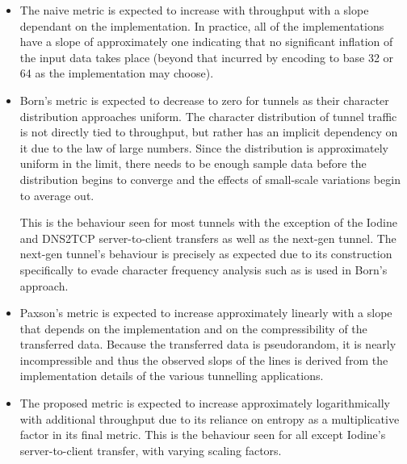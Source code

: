 \documentclass[12pt]{report}
\theoremstyle{remark}
\theoremstyle{definition}
\theoremstyle{definition}
\theoremstyle{definition}
\begin{document}
\begin{itemize}
\item The naive metric is expected to increase with throughput with a slope
dependant on the implementation. In practice, all of the implementations have a
slope of approximately one indicating that no significant inflation of the input
data takes place (beyond that incurred by encoding to base 32 or 64 as the
implementation may choose).

\item Born's metric is expected to decrease to zero for tunnels as their
character distribution approaches uniform. The character distribution of tunnel
traffic is not directly tied to throughput, but rather has an implicit
dependency on it due to the law of large numbers. Since the distribution is
approximately uniform in the limit, there needs to be enough sample data before
the distribution begins to converge and the effects of small-scale variations
begin to average out.

This is the behaviour seen for most tunnels with the exception of the Iodine and
DNS2TCP server-to-client transfers as well as the next-gen tunnel. The next-gen
tunnel's behaviour is precisely as expected due to its construction specifically
to evade character frequency analysis such as is used in Born's approach.

\item Paxson's metric is expected to increase approximately linearly with a
slope that depends on the implementation and on the compressibility of the
transferred data. Because the transferred data is pseudorandom, it is nearly
incompressible and thus the observed slops of the lines is derived from the
implementation details of the various tunnelling applications.

\item The proposed metric is expected to increase approximately logarithmically
with additional throughput due to its reliance on entropy as a multiplicative
factor in its final metric. This is the behaviour seen for all except
Iodine's server-to-client transfer, with varying scaling factors.

\end{itemize}
\end{document}

